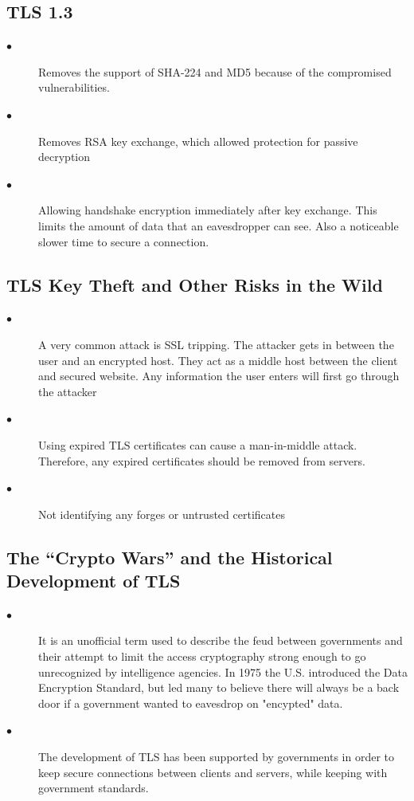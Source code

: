 \documentclass[11pt]{article} %
\begin{document}
\subsection{TLS 1.3}
\begin{description}
  \item[$\bullet$] Removes the support of SHA-224 and MD5 because of the compromised vulnerabilities. 
  \item[$\bullet$] Removes RSA key exchange, which allowed protection for passive decryption
  \item[$\bullet$] Allowing handshake encryption immediately after key exchange. This limits the amount of data that an eavesdropper can see. Also a noticeable slower time to secure a connection.
\end{description}

\subsection{TLS Key Theft and Other Risks in the Wild}
\begin{description}
  \item[$\bullet$] A very common attack is SSL tripping. The attacker gets in between the user and an encrypted host. They act as a middle host between the client and secured website. Any information the user enters will first go through the attacker
  \item[$\bullet$] Using expired TLS certificates can cause a man-in-middle attack. Therefore, any expired certificates should be removed from servers.
 \item[$\bullet$] Not identifying any forges or untrusted certificates
\end{description}

\subsection{The “Crypto Wars” and the Historical Development of TLS}
\begin{description}
  \item[$\bullet$] It is an unofficial term used to describe the feud between governments and their attempt to limit the access cryptography strong enough to go unrecognized by intelligence agencies. In 1975 the U.S. introduced the Data Encryption Standard, but led many to believe there will always be a back door if a government wanted to eavesdrop on "encypted" data.
  \item[$\bullet$] The development of TLS has been supported by governments in order to keep secure connections between clients and servers, while keeping with government standards.
\end{description}
\end{document}
